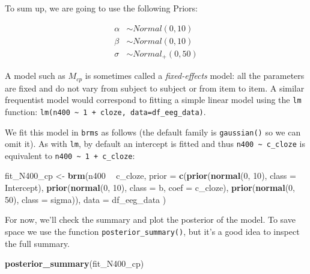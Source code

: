 \documentclass[12pt,]{krantz}
\newenvironment{Shaded}{\begin{snugshade}}{\end{snugshade}}
\newcommand{\DataTypeTok}[1]{\textcolor[rgb]{0.13,0.29,0.53}{#1}}
\newcommand{\DecValTok}[1]{\textcolor[rgb]{0.00,0.00,0.81}{#1}}
\newcommand{\KeywordTok}[1]{\textcolor[rgb]{0.13,0.29,0.53}{\textbf{#1}}}
\newcommand{\NormalTok}[1]{#1}
\newcommand{\OperatorTok}[1]{\textcolor[rgb]{0.81,0.36,0.00}{\textbf{#1}}}
\newcommand{\StringTok}[1]{\textcolor[rgb]{0.31,0.60,0.02}{#1}}
\theoremstyle{definition}
\theoremstyle{definition}
\theoremstyle{definition}
\theoremstyle{remark}
\begin{document}
To sum up, we are going to use the following Priors:

\begin{equation}
 \begin{aligned}
 \alpha &\sim Normal(0,10)\\
 \beta  &\sim Normal(0,10)\\
 \sigma  &\sim Normal_{+}(0,50)
 \end{aligned}
 \end{equation}

A model such as \(M_{cp}\) is sometimes called a \emph{fixed-effects} model: all the parameters are fixed and do not vary from subject to subject or from item to item. A similar frequentist model would correspond to fitting a simple linear model using the \texttt{lm} function: \texttt{lm(n400\ \textasciitilde{}\ 1\ +\ cloze,\ data=df\_eeg\_data)}.

We fit this model in \texttt{brms} as follows (the default family is \texttt{gaussian()} so we can omit it). As with \texttt{lm}, by default an intercept is fitted and thus \texttt{n400\ \textasciitilde{}\ c\_cloze} is equivalent to \texttt{n400\ \textasciitilde{}\ 1\ +\ c\_cloze}:

\begin{Shaded}
\begin{Highlighting}[]
\NormalTok{fit_N400_cp <-}\StringTok{ }\KeywordTok{brm}\NormalTok{(n400 }\OperatorTok{~}\StringTok{ }\NormalTok{c_cloze,}
  \DataTypeTok{prior =} 
    \KeywordTok{c}\NormalTok{(}\KeywordTok{prior}\NormalTok{(}\KeywordTok{normal}\NormalTok{(}\DecValTok{0}\NormalTok{, }\DecValTok{10}\NormalTok{), }\DataTypeTok{class =}\NormalTok{ Intercept),}
      \KeywordTok{prior}\NormalTok{(}\KeywordTok{normal}\NormalTok{(}\DecValTok{0}\NormalTok{, }\DecValTok{10}\NormalTok{), }\DataTypeTok{class =}\NormalTok{ b, }\DataTypeTok{coef =}\NormalTok{ c_cloze),}
      \KeywordTok{prior}\NormalTok{(}\KeywordTok{normal}\NormalTok{(}\DecValTok{0}\NormalTok{, }\DecValTok{50}\NormalTok{), }\DataTypeTok{class =}\NormalTok{ sigma)),}
  \DataTypeTok{data =}\NormalTok{ df_eeg_data}
\NormalTok{)}
\end{Highlighting}
\end{Shaded}

For now, we'll check the summary and plot the posterior of the model. To save space we use the function \texttt{posterior\_summary()}, but it's a good idea to inspect the full summary.

\begin{Shaded}
\begin{Highlighting}[]
\KeywordTok{posterior_summary}\NormalTok{(fit_N400_cp)}
\end{Highlighting}
\end{Shaded}
\end{document}
